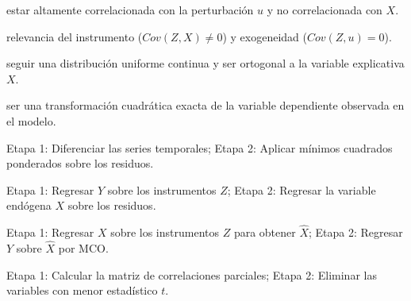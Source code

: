 \begin{opts}
    \item estar altamente correlacionada con la perturbación $u$ y no correlacionada con $X$.
    \item relevancia del instrumento ($Cov(Z, X) \neq 0$) y exogeneidad ($Cov(Z, u) = 0$).
    \item seguir una distribución uniforme continua y ser ortogonal a la variable explicativa $X$.
    \item ser una transformación cuadrática exacta de la variable dependiente observada en el modelo.
\end{opts}

\begin{opts}
    \item Etapa 1: Diferenciar las series temporales; Etapa 2: Aplicar mínimos cuadrados ponderados sobre los residuos.
    \item Etapa 1: Regresar $Y$ sobre los instrumentos $Z$; Etapa 2: Regresar la variable endógena $X$ sobre los residuos.
    \item Etapa 1: Regresar $X$ sobre los instrumentos $Z$ para obtener $\hat{X}$; Etapa 2: Regresar $Y$ sobre $\hat{X}$ por MCO.
    \item Etapa 1: Calcular la matriz de correlaciones parciales; Etapa 2: Eliminar las variables con menor estadístico $t$.
\end{opts}

